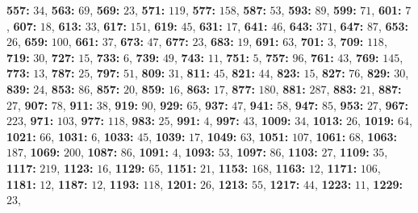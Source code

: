 \textsf{\bfseries 557:} $34$, \textsf{\bfseries 563:} $69$, \textsf{\bfseries 569:} $23$, \textsf{\bfseries 571:} $119$, \textsf{\bfseries 577:} $158$, \textsf{\bfseries 587:} $53$, \textsf{\bfseries 593:} $89$, \textsf{\bfseries 599:} $71$, \textsf{\bfseries 601:} $7$, \textsf{\bfseries 607:} $18$, \textsf{\bfseries 613:} $33$, \textsf{\bfseries 617:} $151$, \textsf{\bfseries 619:} $45$, \textsf{\bfseries 631:} $17$, \textsf{\bfseries 641:} $46$, \textsf{\bfseries 643:} $371$, \textsf{\bfseries 647:} $87$, \textsf{\bfseries 653:} $26$, \textsf{\bfseries 659:} $100$, \textsf{\bfseries 661:} $37$, \textsf{\bfseries 673:} $47$, \textsf{\bfseries 677:} $23$, \textsf{\bfseries 683:} $19$, \textsf{\bfseries 691:} $63$, \textsf{\bfseries 701:} $3$, \textsf{\bfseries 709:} $118$, \textsf{\bfseries 719:} $30$, \textsf{\bfseries 727:} $15$, \textsf{\bfseries 733:} $6$, \textsf{\bfseries 739:} $49$, \textsf{\bfseries 743:} $11$, \textsf{\bfseries 751:} $5$, \textsf{\bfseries 757:} $96$, \textsf{\bfseries 761:} $43$, \textsf{\bfseries 769:} $145$, \textsf{\bfseries 773:} $13$, \textsf{\bfseries 787:} $25$, \textsf{\bfseries 797:} $51$, \textsf{\bfseries 809:} $31$, \textsf{\bfseries 811:} $45$, \textsf{\bfseries 821:} $44$, \textsf{\bfseries 823:} $15$, \textsf{\bfseries 827:} $76$, \textsf{\bfseries 829:} $30$, \textsf{\bfseries 839:} $24$, \textsf{\bfseries 853:} $86$, \textsf{\bfseries 857:} $20$, \textsf{\bfseries 859:} $16$, \textsf{\bfseries 863:} $17$, \textsf{\bfseries 877:} $180$, \textsf{\bfseries 881:} $287$, \textsf{\bfseries 883:} $21$, \textsf{\bfseries 887:} $27$, \textsf{\bfseries 907:} $78$, \textsf{\bfseries 911:} $38$, \textsf{\bfseries 919:} $90$, \textsf{\bfseries 929:} $65$, \textsf{\bfseries 937:} $47$, \textsf{\bfseries 941:} $58$, \textsf{\bfseries 947:} $85$, \textsf{\bfseries 953:} $27$, \textsf{\bfseries 967:} $223$, \textsf{\bfseries 971:} $103$, \textsf{\bfseries 977:} $118$, \textsf{\bfseries 983:} $25$, \textsf{\bfseries 991:} $4$, \textsf{\bfseries 997:} $43$, \textsf{\bfseries 1009:} $34$, \textsf{\bfseries 1013:} $26$, \textsf{\bfseries 1019:} $64$, \textsf{\bfseries 1021:} $66$, \textsf{\bfseries 1031:} $6$, \textsf{\bfseries 1033:} $45$, \textsf{\bfseries 1039:} $17$, \textsf{\bfseries 1049:} $63$, \textsf{\bfseries 1051:} $107$, \textsf{\bfseries 1061:} $68$, \textsf{\bfseries 1063:} $187$, \textsf{\bfseries 1069:} $200$, \textsf{\bfseries 1087:} $86$, \textsf{\bfseries 1091:} $4$, \textsf{\bfseries 1093:} $53$, \textsf{\bfseries 1097:} $86$, \textsf{\bfseries 1103:} $27$, \textsf{\bfseries 1109:} $35$, \textsf{\bfseries 1117:} $219$, \textsf{\bfseries 1123:} $16$, \textsf{\bfseries 1129:} $65$, \textsf{\bfseries 1151:} $21$, \textsf{\bfseries 1153:} $168$, \textsf{\bfseries 1163:} $12$, \textsf{\bfseries 1171:} $106$, \textsf{\bfseries 1181:} $12$, \textsf{\bfseries 1187:} $12$, \textsf{\bfseries 1193:} $118$, \textsf{\bfseries 1201:} $26$, \textsf{\bfseries 1213:} $55$, \textsf{\bfseries 1217:} $44$, \textsf{\bfseries 1223:} $11$, \textsf{\bfseries 1229:} $23$, 
